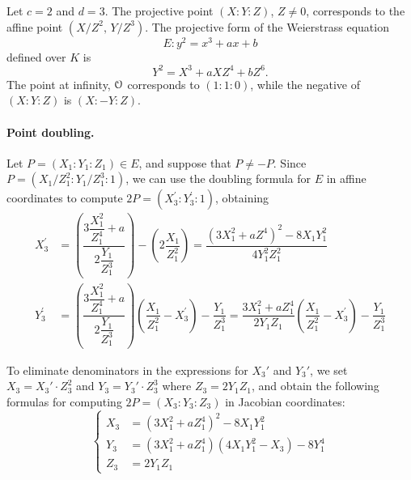 \begin{example}
	\label{ex:ch03.jacobianCoordinates}
	Let $c = 2$ and $d = 3$. The projective point $(X : Y : Z)$, $Z \neq 0$, corresponds
	to the affine point $(X/Z^2,\, Y/Z^3)$. The projective form of the Weierstrass equation
	\begin{equation}
		E : y^2 = x^3 + ax + b
		\label{eq:ch3.weierstrassJacobian}
	\end{equation}
	defined over $K$ is
	\begin{equation}
		Y^2 = X^3 + aXZ^4 + bZ^6.
		\label{eq:ch3.projectiveWeierstrassJacobian}
	\end{equation}
	The point at infinity, $\EuScript{O}$ corresponds to $(1 : 1 : 0)$, while the negative of
	$(X : Y : Z)$ is $(X : -Y : Z)$.
	
	
	\paragraph{Point doubling.}
	Let $P = (X_1 : Y_1 : Z_1) \in E$, and suppose that $P \neq -P$. Since
	$P = (X_1/Z_1^2 : Y_1/Z_1^3 : 1)$, we can use the doubling formula for $E$ in affine
	coordinates to compute $2P = (X_3^{'} : Y_3^{'} : 1)$, obtaining
	\begin{align}
		X_3^{'} &= \left(
			\dfrac{3 \dfrac{X^2_1}{Z_1^4} + a}{2 \dfrac{Y_1}{Z_1^3}}\right) - 
			\left(2 \dfrac{X_1}{Z^2_1}\right) =
				\dfrac{(3X^2_1+aZ^4)^2 - 8X_1Y^2_1}{4Y^2_1 Z^2_1}\\
		Y_3^{'} &=\left(
			\dfrac{3 \dfrac{X^2_1}{Z^4_1} + a}{2 \dfrac{Y_1}{Z^3_1}}
		\right) \left(
			\dfrac{X_1}{Z^2_1} - X_3^{'}
		\right) - \dfrac{Y_1}{Z^3_1} = 
			\dfrac{3 X^2_1 + a Z^4_1}{2Y_1Z_1} \left( \dfrac{X_1}{Z^2_1} - X_3^{'} \right) - \dfrac{Y_1}{Z^3_1}
	\label{projectivecomputedinaffine}
	\end{align}

\end{example}



To eliminate denominators in the expressions for $X_3'$ and $Y_3'$, we set
$X_3 = X_3' \cdot Z_3^2$ and $Y_3 = Y_3' \cdot Z_3^3$ where $Z_3 = 2Y_1 Z_1$,
and obtain the following formulas for computing $2P = (X_3 : Y_3 : Z_3)$ in
Jacobian coordinates:
\begin{equation}
	\left\{
	\begin{aligned}
		X_3 &= (3X_1^2 + aZ_1^4)^2 - 8X_1 Y_1^2 \\
		Y_3 &= (3X_1^2 + aZ_1^4)(4X_1 Y_1^2 - X_3) - 8Y_1^4 \\
		Z_3 &= 2Y_1 Z_1
	\end{aligned}
	\right.
	\label{eq:ch3.jacobianDoubling}
\end{equation}

